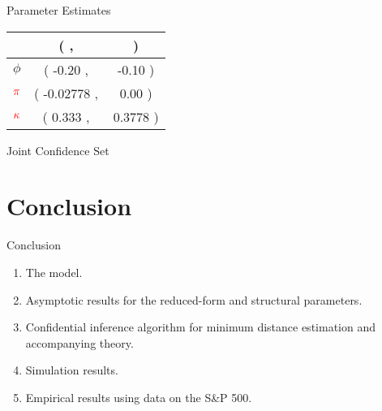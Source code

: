 \documentclass[smaller, aspectratio=169]{beamer}
\newcommand*{\rkappa}{\textcolor{red}{\kappa}}
\newcommand*{\rpi}{\textcolor{red}{\pi}}
\begin{document}
\begin{frame}[c]{Parameter Estimates}
\begin{minipage}{.49\textwidth}
\begin{table}[htb]
            \begin{tabularx}{.75\textwidth}{X | >{{(}} S[table-space-text-pre={(}] <{{,\,}}
              S[table-space-text-pre={\hspace{-1.5cm}}] <{{)}}}
%
            \toprule
            &  \\
            \midrule
            $\phi$   & -0.20 & -0.10    \\
            $\rpi$    & -0.02778 & 0.00   \\
            $\rkappa$   & 0.333 & 0.3778  \\
            \bottomrule 
          \end{tabularx}
        \end{table}
   \end{minipage}


\end{frame}



\begin{frame}[c]{Joint Confidence Set}
    \begin{figure}[htb]
    	
    	\centering
    	\label{fig:confidence_region}
    	
    \end{figure}

\end{frame}

\section{Conclusion}

\begin{frame}[c]{Conclusion}

  \begin{enumerate}
%
      \item[\cmark] The model.
      \bigskip
%
  \item[\cmark] Asymptotic results for the reduced-form and structural parameters.
      \bigskip
%
  \item[\cmark] Confidential inference algorithm for minimum distance estimation and accompanying theory. 
      \bigskip
%
    \item[\cmark] Simulation results. 
      \bigskip
%
    \item[\cmark] Empirical results using data on the S\&P 500.
%
  \end{enumerate}

\end{frame}
\end{document}
